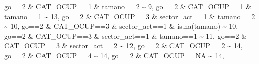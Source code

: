 \documentclass[
]{book}
\newenvironment{Shaded}{\begin{snugshade}}{\end{snugshade}}
\newcommand{\ConstantTok}[1]{\textcolor[rgb]{0.00,0.00,0.00}{#1}}
\newcommand{\DecValTok}[1]{\textcolor[rgb]{0.00,0.00,0.81}{#1}}
\newcommand{\FunctionTok}[1]{\textcolor[rgb]{0.00,0.00,0.00}{#1}}
\newcommand{\NormalTok}[1]{#1}
\newcommand{\SpecialCharTok}[1]{\textcolor[rgb]{0.00,0.00,0.00}{#1}}
\begin{document}
\begin{Shaded}
\begin{Highlighting}[]
\NormalTok{                               go}\SpecialCharTok{==}\DecValTok{2} \SpecialCharTok{\&}\NormalTok{ CAT\_OCUP}\SpecialCharTok{==}\DecValTok{1} \SpecialCharTok{\&}\NormalTok{ tamano}\SpecialCharTok{==}\DecValTok{2} \SpecialCharTok{\textasciitilde{}} \DecValTok{9}\NormalTok{,}
\NormalTok{                               go}\SpecialCharTok{==}\DecValTok{2} \SpecialCharTok{\&}\NormalTok{ CAT\_OCUP}\SpecialCharTok{==}\DecValTok{1} \SpecialCharTok{\&}\NormalTok{ tamano}\SpecialCharTok{==}\DecValTok{1}  \SpecialCharTok{\textasciitilde{}} \DecValTok{13}\NormalTok{,}
\NormalTok{                               go}\SpecialCharTok{==}\DecValTok{2} \SpecialCharTok{\&}\NormalTok{ CAT\_OCUP}\SpecialCharTok{==}\DecValTok{3} \SpecialCharTok{\&}\NormalTok{ sector\_act}\SpecialCharTok{==}\DecValTok{1} \SpecialCharTok{\&}\NormalTok{ tamano}\SpecialCharTok{==}\DecValTok{2} \SpecialCharTok{\textasciitilde{}} \DecValTok{10}\NormalTok{,}
\NormalTok{                               go}\SpecialCharTok{==}\DecValTok{2} \SpecialCharTok{\&}\NormalTok{ CAT\_OCUP}\SpecialCharTok{==}\DecValTok{3} \SpecialCharTok{\&}\NormalTok{ sector\_act}\SpecialCharTok{==}\DecValTok{1} \SpecialCharTok{\&} \FunctionTok{is.na}\NormalTok{(tamano) }\SpecialCharTok{\textasciitilde{}} \DecValTok{10}\NormalTok{,}
\NormalTok{                               go}\SpecialCharTok{==}\DecValTok{2} \SpecialCharTok{\&}\NormalTok{ CAT\_OCUP}\SpecialCharTok{==}\DecValTok{3} \SpecialCharTok{\&}\NormalTok{ sector\_act}\SpecialCharTok{==}\DecValTok{1} \SpecialCharTok{\&}\NormalTok{ tamano}\SpecialCharTok{==}\DecValTok{1}  \SpecialCharTok{\textasciitilde{}} \DecValTok{11}\NormalTok{,}
\NormalTok{                               go}\SpecialCharTok{==}\DecValTok{2} \SpecialCharTok{\&}\NormalTok{ CAT\_OCUP}\SpecialCharTok{==}\DecValTok{3} \SpecialCharTok{\&}\NormalTok{ sector\_act}\SpecialCharTok{==}\DecValTok{2}  \SpecialCharTok{\textasciitilde{}} \DecValTok{12}\NormalTok{,}
\NormalTok{                               go}\SpecialCharTok{==}\DecValTok{2} \SpecialCharTok{\&}\NormalTok{ CAT\_OCUP}\SpecialCharTok{==}\DecValTok{2}  \SpecialCharTok{\textasciitilde{}} \DecValTok{14}\NormalTok{,}
\NormalTok{                               go}\SpecialCharTok{==}\DecValTok{2} \SpecialCharTok{\&}\NormalTok{ CAT\_OCUP}\SpecialCharTok{==}\DecValTok{4}  \SpecialCharTok{\textasciitilde{}} \DecValTok{14}\NormalTok{,}
\NormalTok{                               go}\SpecialCharTok{==}\DecValTok{2} \SpecialCharTok{\&}\NormalTok{ CAT\_OCUP}\SpecialCharTok{==}\ConstantTok{NA}     \SpecialCharTok{\textasciitilde{}} \DecValTok{14}\NormalTok{,}
         

\end{Highlighting}
\end{Shaded}
\end{document}
